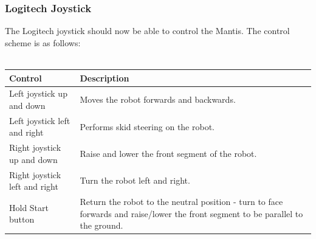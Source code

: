 \documentclass[]{article}
\begin{document}
\subsubsection{Logitech Joystick}
The Logitech joystick should now be able to control the Mantis. The control scheme is as follows:
\\
\\
\begin{tabular}{ | l | p{7cm} | }
\hline
\textbf{Control} & \textbf{Description} \\ \hline
Left joystick up and down & Moves the robot forwards and backwards. \\ \hline
Left joystick left and right & Performs skid steering on the robot. \\ \hline
Right joystick up and down & Raise and lower the front segment of the robot. \\ \hline
Right joystick left and right & Turn the robot left and right. \\ \hline
Hold Start button & Return the robot to the neutral position - turn to face forwards and raise/lower the front segment to be parallel to the ground. \\ \hline
\end{tabular}
\end{document}
